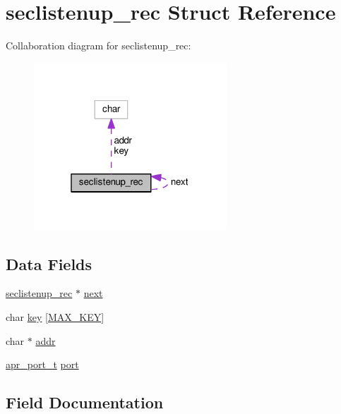 \hypertarget{structseclistenup__rec}{}\section{seclistenup\+\_\+rec Struct Reference}
\label{structseclistenup__rec}


Collaboration diagram for seclistenup\+\_\+rec\+:
\nopagebreak
\begin{figure}[H]
\begin{center}
\leavevmode
\includegraphics[width=205pt]{structseclistenup__rec__coll__graph}
\end{center}
\end{figure}
\subsection*{Data Fields}
\begin{DoxyCompactItemize}
\item 
\hyperlink{structseclistenup__rec}{seclistenup\+\_\+rec} $\ast$ \hyperlink{structseclistenup__rec_a5a517ecc5a6836836ca202763f328477}{next}
\item 
char \hyperlink{structseclistenup__rec_a66259ac3184b9677cd07b8ea21c365e3}{key} \mbox{[}\hyperlink{mod__nw__ssl_8c_a3cb816ed7690a32c5d6f67d7cb615ca4}{M\+A\+X\+\_\+\+K\+EY}\mbox{]}
\item 
char $\ast$ \hyperlink{structseclistenup__rec_a1b6ab9ef19faccecb6d4a75bc3726c18}{addr}
\item 
\hyperlink{group__apr__network__io_gaa670a71960f6eb4fe0d0de2a1e7aba03}{apr\+\_\+port\+\_\+t} \hyperlink{structseclistenup__rec_a6b4866bdfe4717dec5e24500ec10822c}{port}
\end{DoxyCompactItemize}


\subsection{Field Documentation}
